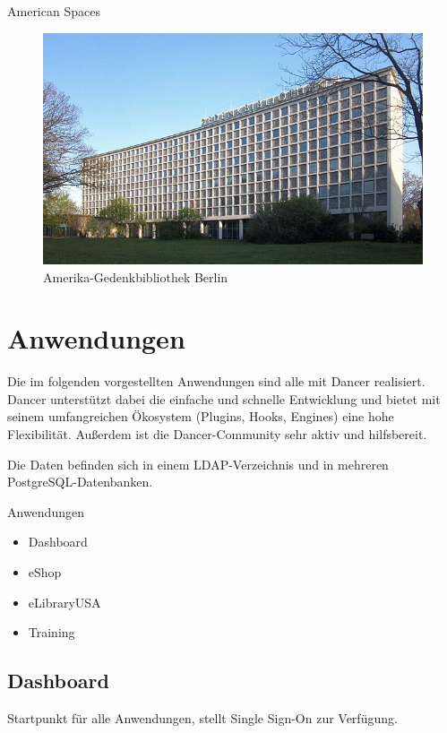 \begin{frame}{American Spaces}
\begin{figure}
\includegraphics{Amerika-Gedenk-Bibliothek.jpg}
\caption{Amerika-Gedenkbibliothek Berlin}
\end{figure}
\end{frame}

\section{Anwendungen}
    
Die im folgenden vorgestellten Anwendungen sind alle mit Dancer realisiert.
Dancer unterstützt dabei die einfache und schnelle Entwicklung und bietet mit
seinem umfangreichen Ökosystem (Plugins, Hooks, Engines) eine hohe
Flexibilität. Außerdem ist die Dancer-Community sehr aktiv und
hilfsbereit.

Die Daten befinden sich in einem LDAP-Verzeichnis und in
mehreren PostgreSQL-Datenbanken.

\begin{frame}{Anwendungen}
\begin{itemize}
\item Dashboard
\item eShop
\item eLibraryUSA
\item Training
\end{itemize}
\end{frame}

\subsection{Dashboard}
Startpunkt für alle Anwendungen, stellt Single Sign-On zur Verfügung.

